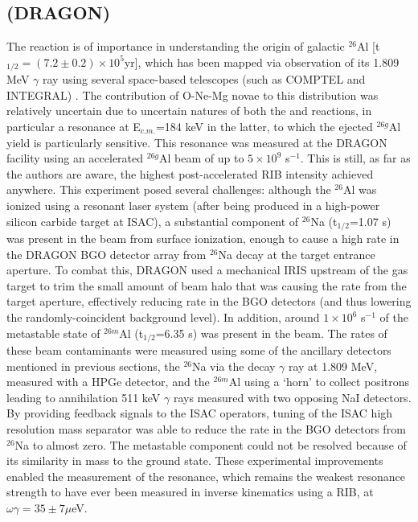 \subsection{ (DRAGON)}
The  reaction is of importance in understanding the origin of galactic $^{26}$Al [t$_{1/2}=(7.2\pm0.2)\times10^{5}$yr], which has been mapped via observation of its 1.809 MeV $\gamma$ ray using several space-based telescopes (such as COMPTEL and INTEGRAL) \cite{smi03,kno04,die95}. The contribution of O-Ne-Mg novae to this distribution was relatively uncertain due to uncertain natures of both the  and  reactions, in particular a resonance at E$_{c.m.}$=184 keV in the latter, to which the ejected $^{26g}$Al yield is particularly sensitive. This resonance was measured \cite{rui06} at the DRAGON facility using an accelerated $^{26g}$Al beam of up to $5\times10^{9}$ s$^{-1}$. This is still, as far as the authors are aware, the highest post-accelerated RIB intensity achieved anywhere. This experiment posed several challenges: although the $^{26}$Al was ionized using a resonant laser system (after being produced in a high-power silicon carbide target at ISAC), a substantial component of $^{26}$Na (t$_{1/2}$=1.07 s) was present in the beam from surface ionization, enough to cause a high rate in the DRAGON BGO detector array from $^{26}$Na decay at the target entrance aperture. To combat this, DRAGON used  a mechanical IRIS upstream of the gas target to trim the small amount of beam halo that was causing the rate from the target aperture, effectively reducing rate in the BGO detectors (and thus lowering the randomly-coincident background level). In addition, around $1\times10^{6}$ s$^{-1}$ of the metastable state of $^{26m}$Al (t$_{1/2}$=6.35 s) was present in the beam. The rates of these beam contaminants were measured using some of the ancillary detectors mentioned in previous sections, the $^{26}$Na via the decay $\gamma$ ray at 1.809 MeV, measured with a HPGe detector, and the $^{26m}$Al using a `horn' to collect positrons leading to annihilation 511 keV $\gamma$ rays measured with two opposing NaI detectors. By providing feedback signals to the ISAC operators, tuning of the ISAC high resolution mass separator was able to reduce the rate in the BGO detectors from $^{26}$Na to almost zero. The metastable component could not be resolved because of its similarity in mass to the ground state. 
These experimental improvements enabled the measurement of the resonance, which remains the weakest resonance strength to have ever been measured in inverse kinematics using a RIB, at $\omega\gamma=35\pm7 \mu$eV. 

